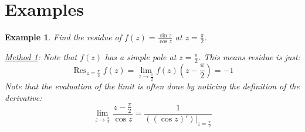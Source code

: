 \documentclass[a4paper]{article}
\newtheorem{example}{Example}
\newcommand{\res}{\mathop{\mathrm{Res}}}
\begin{document}
\section{Examples}
\begin{example}
    Find the residue of $f(z) = \frac{\sin{z}}{\cos{z}}$ at $z=\frac{\pi}{2}$.

    \underline{Method 1}: Note that $f(z)$ has a simple pole at $z=\frac{\pi}{2}$. This means residue is just:
    \begin{equation*}
        \res_{z=\frac{\pi}{2}} f(z) = \lim_{z\rightarrow\frac{\pi}{2}} f(z) (z-\frac{\pi}{2}) = -1
    \end{equation*}
    Note that the evaluation of the limit is often done by noticing the definition of the derivative:
    \begin{equation*}
        \lim_{z\rightarrow\frac{\pi}{2}} \frac{z-\frac{\pi}{2}}{\cos{z}} = \frac{1}{\left( (\cos{z})' \right)|_{z=\frac{\pi}{2}}}
    \end{equation*}


\end{example}
\end{document}
